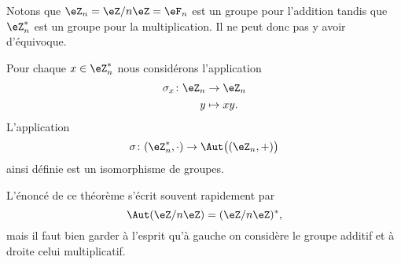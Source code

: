 Notons que \( \eZ_n=\eZ/n\eZ=\eF_n\) est un groupe pour l'addition tandis que \( \eZ_n^*\) est un groupe pour la multiplication. Il ne peut donc pas y avoir d'équivoque.

\begin{theorem}   \label{ThoozyeSn}
    Pour chaque \( x\in \eZ_n^*\) nous considérons l'application
    \begin{equation}
        \begin{aligned}
            \sigma_x\colon \eZ_n&\to \eZ_n \\
            y&\mapsto xy. 
        \end{aligned}
    \end{equation}
    L'application
    \begin{equation}
        \sigma\colon (\eZ_n^*,\cdot)\to \Aut\big( (\eZ_n,+) \big)
    \end{equation}
    ainsi définie est un isomorphisme de groupes.
\end{theorem}
L'énoncé de ce théorème s'écrit souvent rapidement par 
\begin{equation}
    \Aut(\eZ/n\eZ)=(\eZ/n\eZ)^*,
\end{equation}
mais il faut bien garder à l'esprit qu'à gauche on considère le groupe additif et à droite celui multiplicatif.

